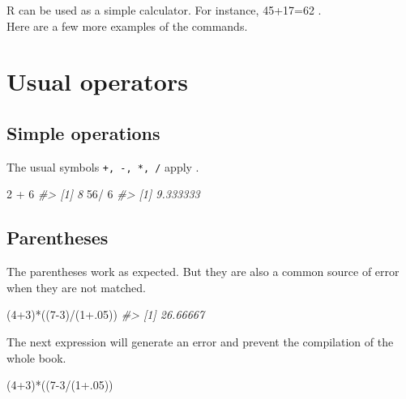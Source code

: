 \documentclass[]{book}
\newenvironment{Shaded}{}{}
\newcommand{\CommentTok}[1]{\textcolor[rgb]{0.38,0.63,0.69}{\textit{#1}}}
\newcommand{\DecValTok}[1]{\textcolor[rgb]{0.25,0.63,0.44}{#1}}
\newcommand{\FloatTok}[1]{\textcolor[rgb]{0.25,0.63,0.44}{#1}}
\newcommand{\NormalTok}[1]{#1}
\newcommand{\OperatorTok}[1]{\textcolor[rgb]{0.40,0.40,0.40}{#1}}
\newcommand{\StringTok}[1]{\textcolor[rgb]{0.25,0.44,0.63}{#1}}
\theoremstyle{definition}
\theoremstyle{definition}
\theoremstyle{definition}
\theoremstyle{remark}
\begin{document}
R can be used as a simple calculator. For instance, 45+17=62 .\\
Here are a few more examples of the commands.

\hypertarget{usual-operators}{%
\section{Usual operators}\label{usual-operators}}

\hypertarget{simple-operations}{%
\subsection{Simple operations}\label{simple-operations}}

The usual symbols \texttt{+,\ -,\ *,\ /} apply .

\begin{Shaded}
\begin{Highlighting}[]
\DecValTok{2} \OperatorTok{+}\StringTok{ }\DecValTok{6}
\CommentTok{#> [1] 8}
\DecValTok{56}\OperatorTok{/}\StringTok{ }\DecValTok{6}
\CommentTok{#> [1] 9.333333}
\end{Highlighting}
\end{Shaded}

\hypertarget{parentheses}{%
\subsection{Parentheses}\label{parentheses}}

The parentheses work as expected. But they are also a common source of
error when they are not matched.

\begin{Shaded}
\begin{Highlighting}[]
\NormalTok{(}\DecValTok{4}\OperatorTok{+}\DecValTok{3}\NormalTok{)}\OperatorTok{*}\NormalTok{((}\DecValTok{7-3}\NormalTok{)}\OperatorTok{/}\NormalTok{(}\DecValTok{1}\FloatTok{+.05}\NormalTok{))}
\CommentTok{#> [1] 26.66667}
\end{Highlighting}
\end{Shaded}

The next expression will generate an error and prevent the compilation
of the whole book.

\begin{Shaded}
\begin{Highlighting}[]
\NormalTok{(}\DecValTok{4}\OperatorTok{+}\DecValTok{3}\NormalTok{)}\OperatorTok{*}\NormalTok{((}\DecValTok{7-3}\OperatorTok{/}\NormalTok{(}\DecValTok{1}\FloatTok{+.05}\NormalTok{))}
\end{Highlighting}
\end{Shaded}
\end{document}
